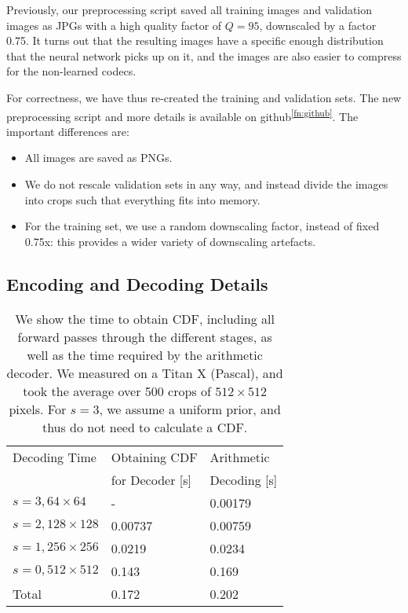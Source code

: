 \documentclass[10pt,twocolumn,letterpaper]{article}
\begin{document}
Previously, our preprocessing script saved all training images and validation images as JPGs with a high quality factor of $Q=95$, downscaled by a factor 0.75. It turns out that the resulting images have a specific enough distribution that the neural network picks up on it, and the images are also easier to compress for the non-learned codecs. 

For correctness, we have thus re-created the training and validation sets. The new preprocessing script and more details is available on github\textsuperscript{\ref{fn:github}}. The important differences are:
\begin{itemize}[leftmargin=*,topsep=0pt,itemsep=-1ex,partopsep=1ex,parsep=1ex]
\item All images are saved as PNGs.
\item We do not rescale validation sets in any way, and instead divide the images into crops such that everything fits into memory.
\item For the training set, we use a random downscaling factor, instead of fixed 0.75x: this provides a wider variety of downscaling artefacts.
\end{itemize}


\subsection{Encoding and Decoding Details} \label{sec:suppl_decoding_details}

\begin{table}[b]
    \centering
    \begin{tabular}{lll}
        \toprule
         Decoding Time & Obtaining CDF      & Arithmetic \\
                       & for Decoder [s]     & Decoding [s] \\
         \midrule
         $s=3, 64\times64$      & - & 0.00179 \\
         $s=2, 128\times128$    & 0.00737 & 0.00759 \\
         $s=1, 256\times256$    & 0.0219 & 0.0234 \\
         $s=0, 512\times512$    & 0.143 & 0.169 \\
         \midrule
         Total & 0.172 & 0.202 \\
         \bottomrule
    \end{tabular}
    \caption{\label{table:enc_dec_details}We show the time to obtain CDF, including all forward passes through the different stages, as well as the time required by the arithmetic decoder. We measured on a Titan X (Pascal), and took the average over 500 crops of $512 \times 512$ pixels. For $s=3$, we assume a uniform prior, and thus do not need to calculate a CDF.}
\end{table}
\end{document}
